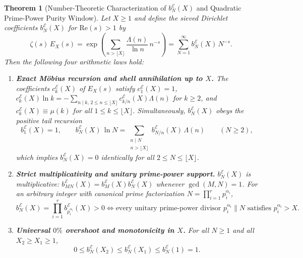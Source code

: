 \documentclass[11pt,reqno]{amsart}
\newtheorem{theorem}{Theorem}[section]
\theoremstyle{definition}
\theoremstyle{remark}
\numberwithin{equation}{section}
\newcommand{\Rea}{\mathrm{Re}}
\begin{document}
\begin{theorem}[Number-Theoretic Characterization of $b_N^{\mathcal{E}}(X)$ and Quadratic Prime-Power Purity Window]\label{thm:quadratic_purity}
Let $X \ge 1$ and define the sieved Dirichlet coefficients $b_N^{\mathcal{E}}(X)$ for $\Rea(s) > 1$ by
\begin{equation}\label{eq:zeta_EX_product}
\zeta(s)\,E_X(s) = \exp\!\left(\sum_{n > \lfloor X\rfloor} \frac{\Lambda(n)}{\ln n}\,n^{-s}\right) = \sum_{N=1}^{\infty} b_N^{\mathcal{E}}(X)\,N^{-s}.
\end{equation}
Then the following four arithmetic laws hold:
\begin{enumerate}[label=\textup{(\roman*)},leftmargin=2.2em]
\item \textbf{Exact M\"obius recursion and shell annihilation up to $X$.} The coefficients $c_k^{\mathcal{E}}(X)$ of $E_X(s)$ satisfy $c_1^{\mathcal{E}}(X) = 1$, $c_k^{\mathcal{E}}(X)\ln k = -\sum_{n \mid k,\, 2 \le n \le \lfloor X\rfloor} c_{k/n}^{\mathcal{E}}(X)\Lambda(n)$ for $k \ge 2$, and $c_k^{\mathcal{E}}(X) \equiv \mu(k)$ for all $1 \le k \le \lfloor X\rfloor$. Simultaneously, $b_N^{\mathcal{E}}(X)$ obeys the positive tail recursion
\begin{equation}\label{eq:bN_tail_recursion}
b_1^{\mathcal{E}}(X) = 1, \qquad b_N^{\mathcal{E}}(X)\,\ln N = \sum_{\substack{n \mid N \\ n > \lfloor X\rfloor}} b_{N/n}^{\mathcal{E}}(X)\,\Lambda(n) \qquad (N \ge 2),
\end{equation}
which implies $b_N^{\mathcal{E}}(X) = 0$ identically for all $2 \le N \le \lfloor X\rfloor$.
\item \textbf{Strict multiplicativity and unitary prime-power support.} $b_N^{\mathcal{E}}(X)$ is multiplicative: $b_{MN}^{\mathcal{E}}(X) = b_M^{\mathcal{E}}(X)b_N^{\mathcal{E}}(X)$ whenever $\gcd(M,N) = 1$. For an arbitrary integer with canonical prime factorization $N = \prod_{i=1}^r p_i^{\alpha_i}$,
\begin{equation}\label{eq:unitary_support}
b_N^{\mathcal{E}}(X) = \prod_{i=1}^r b_{p_i^{\alpha_i}}^{\mathcal{E}}(X) > 0 \iff \text{every unitary prime-power divisor } p_i^{\alpha_i} \parallel N \text{ satisfies } p_i^{\alpha_i} > X.
\end{equation}
\item \textbf{Universal $0\%$ overshoot and monotonicity in $X$.} For all $N \ge 1$ and all $X_2 \ge X_1 \ge 1$,
\begin{equation}\label{eq:universal_bounds_mono}
0 \le b_N^{\mathcal{E}}(X_2) \le b_N^{\mathcal{E}}(X_1) \le b_N^{\mathcal{E}}(1) = 1.

\end{equation}
\end{enumerate}
\end{theorem}
\end{document}
